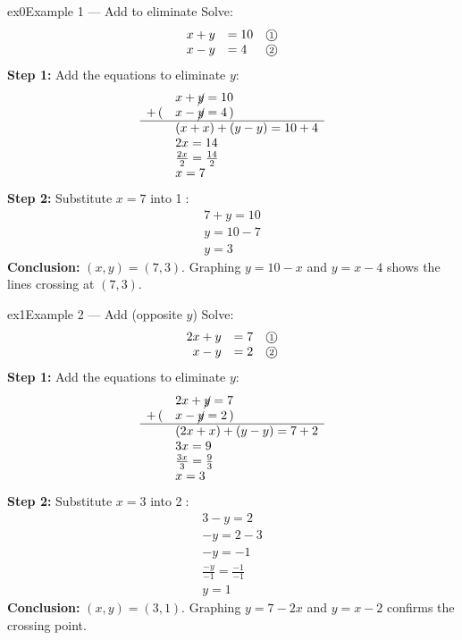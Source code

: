 \documentclass[11pt]{article}
\begin{document}
\begin{example}{ex0}{Example 1 --- Add to eliminate}
Solve:\[\begin{array}{rll} x+y & = 10 & \text{\textcircled{\scriptsize 1}}\\ x-y & = 4 & \text{\textcircled{\scriptsize 2}} \end{array}\]\soln
\textbf{Step 1:} Add the equations to eliminate $y$:\[\begin{array}{rl} & x+\cancel{y}=10\\ +\,( & x-\cancel{y}=4\,)\\ \hline & (x+x)+(y-y)=10+4\\ & 2x=14\\ & \frac{2x}{2}=\frac{14}{2}\\ & x=7 \end{array}\]
\textbf{Step 2:} Substitute $x=7$ into \textcircled{\scriptsize 1}:\[\begin{array}{l} 7+y=10\\ y=10-7\\ y=3 \end{array}\]
\textbf{Conclusion:} $(x,y)=(7,3)$.
Graphing $y=10-x$ and $y=x-4$ shows the lines crossing at $(7,3)$.
\end{example}

\begin{example}{ex1}{Example 2 --- Add (opposite $y$)}
Solve:\[\begin{array}{rll} 2x+y & = 7 & \text{\textcircled{\scriptsize 1}}\\ x-y & = 2 & \text{\textcircled{\scriptsize 2}} \end{array}\]\soln
\textbf{Step 1:} Add the equations to eliminate $y$:\[\begin{array}{rl} & 2x+\cancel{y}=7\\ +\,( & x-\cancel{y}=2\,)\\ \hline & (2x+x)+(y-y)=7+2\\ & 3x=9\\ & \frac{3x}{3}=\frac{9}{3}\\ & x=3 \end{array}\]
\textbf{Step 2:} Substitute $x=3$ into \textcircled{\scriptsize 2}:\[\begin{array}{l} 3-y=2\\ -y=2-3\\ -y=-1\\ \frac{-y}{-1}=\frac{-1}{-1}\\ y=1 \end{array}\]
\textbf{Conclusion:} $(x,y)=(3,1)$.
Graphing $y=7-2x$ and $y=x-2$ confirms the crossing point.
\end{example}
\end{document}
